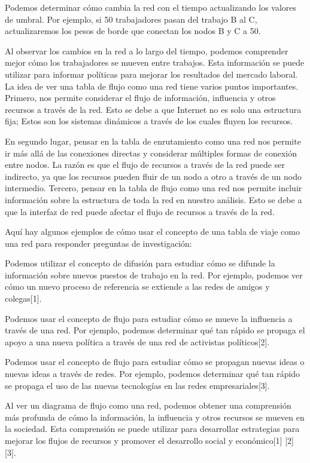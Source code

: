 \documentclass{article}
\begin{document}
Podemos determinar cómo cambia la red con el tiempo actualizando los valores de umbral. Por ejemplo, si 50 trabajadores pasan del trabajo B al C, actualizaremos los pesos de borde que conectan los nodos B y C a 50.

Al observar los cambios en la red a lo largo del tiempo, podemos comprender mejor cómo los trabajadores se mueven entre trabajos. Esta información se puede utilizar para informar políticas para mejorar los resultados del mercado laboral. La idea de ver una tabla de flujo como una red tiene varios puntos importantes. Primero, nos permite considerar el flujo de información, influencia y otros recursos a través de la red. Esto se debe a que Internet no es solo una estructura fija; Estos son los sistemas dinámicos a través de los cuales fluyen los recursos.

En segundo lugar, pensar en la tabla de enrutamiento como una red nos permite ir más allá de las conexiones directas y considerar múltiples formas de conexión entre nodos. La razón es que el flujo de recursos a través de la red puede ser indirecto, ya que los recursos pueden fluir de un nodo a otro a través de un nodo intermedio. Tercero, pensar en la tabla de flujo como una red nos permite incluir información sobre la estructura de toda la red en nuestro análisis. Esto se debe a que la interfaz de red puede afectar el flujo de recursos a través de la red.

Aquí hay algunos ejemplos de cómo usar el concepto de una tabla de viaje como una red para responder preguntas de investigación:

Podemos utilizar el concepto de difusión para estudiar cómo se difunde la información sobre nuevos puestos de trabajo en la red. Por ejemplo, podemos ver cómo un nuevo proceso de referencia se extiende a las redes de amigos y colegas[1].

Podemos usar el concepto de flujo para estudiar cómo se mueve la influencia a través de una red. Por ejemplo, podemos determinar qué tan rápido se propaga el apoyo a una nueva política a través de una red de activistas políticos[2].

Podemos usar el concepto de flujo para estudiar cómo se propagan nuevas ideas o nuevas ideas a través de redes. Por ejemplo, podemos determinar qué tan rápido se propaga el uso de las nuevas tecnologías en las redes empresariales[3].

Al ver un diagrama de flujo como una red, podemos obtener una comprensión más profunda de cómo la información, la influencia y otros recursos se mueven en la sociedad. Esta comprensión se puede utilizar para desarrollar estrategias para mejorar los flujos de recursos y promover el desarrollo social y económico[1] [2] [3]. 
\end{document}
